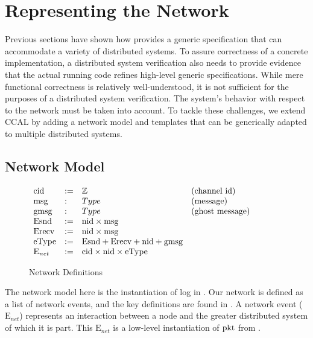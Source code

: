 \section{Representing the Network}
\label{sec:low-level-implementation}

Previous sections have shown how \sysname{} provides a generic specification
that can accommodate a variety of distributed systems.  To assure correctness of
a concrete implementation, a distributed system verification also needs to
provide evidence that the actual running code refines high-level generic
specifications. While mere functional correctness is relatively well-understood,
it is not sufficient for the purposes of a distributed system verification. The
system's behavior with respect to the network must be taken into account. To
tackle these challenges, we extend CCAL by adding a network model and templates
that can be generically adapted to multiple distributed systems.

\subsection{Network Model}
\label{subsec:network-model}

\begin{figure}
\begin{small}
\raggedright
$
\begin{array}{llll}
\mathrm{cid} & := & \mathbb{Z} & \mbox{(channel id)} \\
\mathrm{msg} & : & Type & \mbox{(message)} \\
\mathrm{gmsg} & : & Type & \mbox{(ghost message)} \\
\mathrm{Esnd} & := & \mathrm{nid} \times \mathrm{msg} \\
\mathrm{Erecv} & := & \mathrm{nid} \times \mathrm{msg} \\
\mathrm{eType} & := & \mathrm{Esnd} + \mathrm{Erecv} + \mathrm{nid} + \mathrm{gmsg} \\
\mathrm{E}_{net} & := & \mathrm{cid} \times \mathrm{nid} \times \mathrm{eType} \\
\end{array}
$
\end{small}
\vspace{-1em}
\caption{Network Definitions}
\label{fig:net-defs}
\vspace{-1.5em}
\end{figure}

The network model here is the instantiation of log in
. Our network is defined as a list of
network events, and the key definitions are found in . A
network event ($\mathrm{E}_{net}$) represents an interaction between a node and
the greater distributed system of which it is part. This $\mathrm{E}_{net}$ is a
low-level instantiation of $\mathrm{pkt}$ from .

